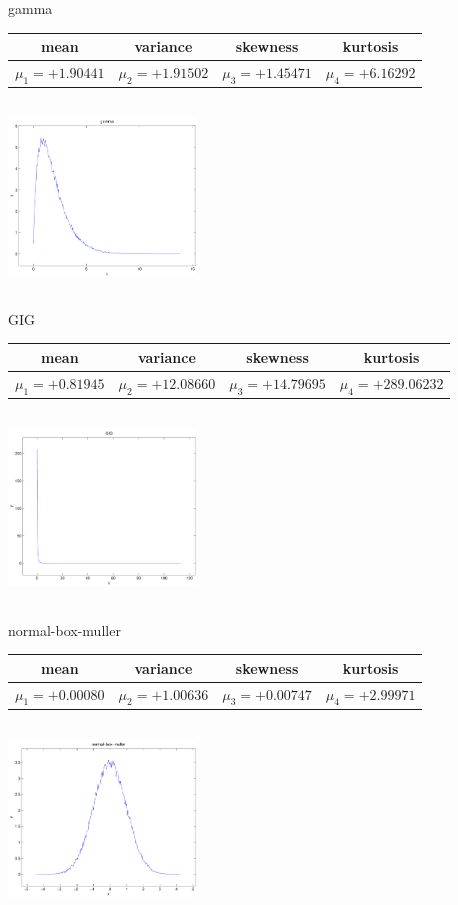 \documentclass[9pt]{article}
\theoremstyle{plain}
\theoremstyle{definition}
\theoremstyle{remark}
\numberwithin{equation}{section}
\begin{document}
\newpage
gamma \begin{tabular}{|c|c|c|c|}  mean & variance & skewness & kurtosis \\  \hline
$\mu_1 = +1.90441$ & $\mu_2 = +1.91502$ & $\mu_3 = +1.45471$ & $\mu_4 =+6.16292$ \\
\end{tabular}

\includegraphics[width=5cm,height=5cm]{gamma.pdf}

GIG \begin{tabular}{|c|c|c|c|}  mean & variance & skewness & kurtosis \\  \hline
$\mu_1 = +0.81945$ & $\mu_2 = +12.08660$ & $\mu_3 = +14.79695$ & $\mu_4 =+289.06232$ \\
\end{tabular}

\includegraphics[width=5cm,height=5cm]{GIG.pdf}

normal-box-muller \begin{tabular}{|c|c|c|c|}  mean & variance & skewness & kurtosis \\  \hline
$\mu_1 = +0.00080$ & $\mu_2 = +1.00636$ & $\mu_3 = +0.00747$ & $\mu_4 =+2.99971$ \\
\end{tabular}

\includegraphics[width=5cm,height=5cm]{normal-box-muller.pdf}
\end{document}
